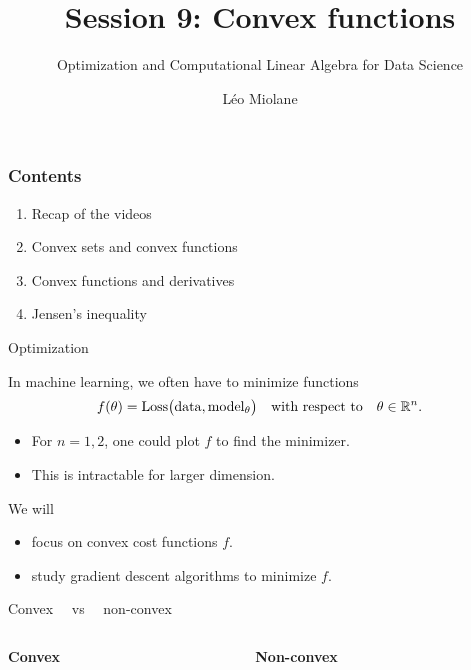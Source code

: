 \documentclass{beamer}
\title{Session 9: Convex functions}
\subtitle{Optimization and Computational Linear Algebra for Data Science}
\author{Léo Miolane}
\date{}
\begin{document}
\setcounter{showProgressBar}{0}
\setcounter{showSlideNumbers}{0}

\frame{\titlepage}
\setcounter{framenumber}{0}
\setcounter{showSlideNumbers}{1}

\begin{frame}
	\frametitle{Contents}
	\begin{enumerate}
		\item Recap of the videos
		\item Convex sets and convex functions
		\item Convex functions and derivatives
		\item Jensen's inequality
	\end{enumerate}
\end{frame}
\begin{frame}[t]{Optimization}
	\grid

	In machine learning, we often have to minimize functions
	$$
	f(\theta) = {\rm Loss}\big( {\rm data}, {\rm model}_{\theta}\big)
	\quad \text{with respect to} \quad \theta \in \mathbb{R}^n.
	$$
	\begin{itemize}
		\item For $n=1,2$, one could plot $f$ to find the minimizer.
		\item This is intractable for larger dimension.
	\end{itemize}

	\vspace{0.2cm}
	\begin{block}{We will}
		\begin{itemize}
			\item focus on convex cost functions $f$.
			\item study gradient descent algorithms to minimize $f$.
		\end{itemize}
	\end{block}
\end{frame}

\begin{frame}[t]{Convex  \ \ vs \ \ non-convex}
	\grid

	\begin{columns}
		\begin{column}{0.45\textwidth}
			\begin{center}
				\textbf{Convex}
			\end{center}
			\vspace{7cm}
	\end{column}
	\vrule
		\begin{column}{0.55\textwidth}
			\begin{center}
				\textbf{Non-convex}
			\end{center}
			\vspace{7cm}
	\end{column}
	\end{columns}

\end{frame}
\end{document}
